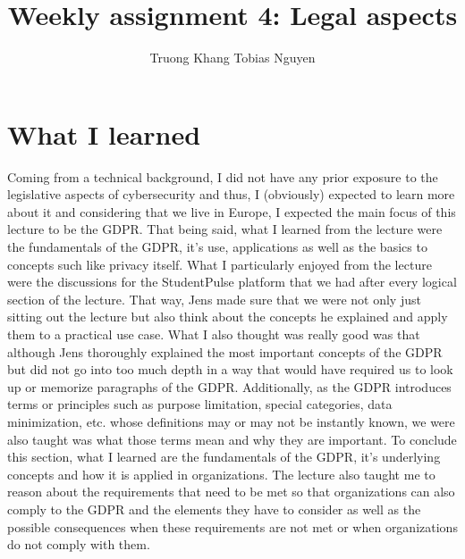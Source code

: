 \documentclass[12pt]{article}
\title{Weekly assignment 4: Legal aspects}
\author{Truong Khang Tobias Nguyen}
\date{}
\begin{document}
\maketitle

\section{What I learned}
Coming from a technical background, I did not have any prior exposure to the legislative aspects of cybersecurity and thus, I (obviously) expected to learn more about it and considering that we live in Europe, I expected the main focus of this lecture to be the GDPR. 
\newline
That being said, what I learned from the lecture were the fundamentals of the GDPR, it's use, applications as well as the basics to concepts such like privacy itself. What I particularly enjoyed from the lecture were the discussions for the StudentPulse platform that we had after every logical section of the lecture. That way, Jens made sure that we were not only just sitting out the lecture but also think about the concepts he explained and apply them to a practical use case.
\newline
What I also thought was really good was that although Jens thoroughly explained the most important concepts of the GDPR but did not go into too much depth in a way that would have required us to look up or memorize paragraphs of the GDPR.
\newline
Additionally, as the GDPR introduces terms or principles such as purpose limitation, special categories, data minimization, etc. whose definitions may or may not be instantly known, we were also taught was what those terms mean and why they are important.
\newline
To conclude this section, what I learned are the fundamentals of the GDPR, it's underlying concepts and how it is applied in organizations. The lecture also taught me to reason about the requirements that need to be met so that organizations can also comply to the GDPR and the elements they have to consider as well as the possible consequences when these requirements are not met or when organizations do not comply with them.
\end{document}
